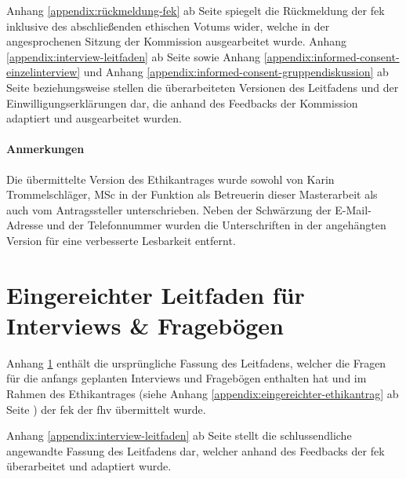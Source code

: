 \documentclass[a4paper,12pt,twoside]{scrreprt}
\begin{document}
\medskip 

Anhang \ref{appendix:rückmeldung-fek} ab Seite \pageref{appendix:rückmeldung-fek} spiegelt die Rückmeldung der \ac{fek} inklusive des abschließenden ethischen Votums wider, welche in der angesprochenen Sitzung der Kommission ausgearbeitet wurde. Anhang \ref{appendix:interview-leitfaden} ab Seite \pageref{appendix:interview-leitfaden} sowie Anhang \ref{appendix:informed-consent-einzelinterview} und Anhang \ref{appendix:informed-consent-gruppendiskussion} ab Seite \pageref{appendix:informed-consent-einzelinterview} beziehungsweise \pageref{appendix:informed-consent-gruppendiskussion} stellen die überarbeiteten Versionen des Leitfadens und der Einwilligungserklärungen dar, die anhand des Feedbacks der Kommission adaptiert und ausgearbeitet wurden.

\subsubsection*{Anmerkungen}
\label{appendix:anmerkungen-eingereichter-ethikantrag}
Die übermittelte Version des Ethikantrages wurde sowohl von Karin Trommelschläger, MSc in der Funktion als Betreuerin dieser Masterarbeit als auch vom Antragssteller unterschrieben. Neben der Schwärzung der E-Mail-Adresse und der Telefonnummer wurden die Unterschriften in der angehängten Version für eine verbesserte Lesbarkeit entfernt.



\chapter{Eingereichter Leitfaden für Interviews \& Fragebögen}
\label{appendix:ursprünglicher-leitfaden}

Anhang \ref{appendix:ursprünglicher-leitfaden} enthält die ursprüngliche Fassung des Leitfadens, welcher die Fragen für die anfangs geplanten Interviews und Fragebögen enthalten hat und im Rahmen des Ethikantrages (siehe Anhang \ref{appendix:eingereichter-ethikantrag} ab Seite \pageref{appendix:eingereichter-ethikantrag}) der \acl{fek} der \acl{fhv} übermittelt wurde.

\medskip

Anhang \ref{appendix:interview-leitfaden} ab Seite \pageref{appendix:interview-leitfaden} stellt die schlussendliche angewandte Fassung des Leitfadens dar, welcher anhand des Feedbacks der \ac{fek} überarbeitet und adaptiert wurde.
\end{document}

